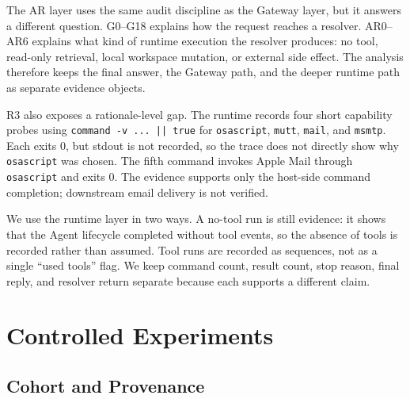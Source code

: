 \documentclass[11pt,a4paper]{article}
\begin{document}
The AR layer uses the same audit discipline as the Gateway layer, but it
answers a different question. G0--G18 explains how the request reaches a
resolver. AR0--AR6 explains what kind of runtime execution the resolver
produces: no tool, read-only retrieval, local workspace mutation, or
external side effect. The analysis therefore keeps the final answer, the
Gateway path, and the deeper runtime path as separate evidence objects.

\begin{table}[H]
\centering
\caption{AR-layer scores. AR2 is a logical outcome stage; no-tool runs
count the observed no-tool outcome, while tool result ratio is reported
separately.}
\label{tab:ar-metrics}
{\scriptsize

}
\end{table}

R3 also exposes a rationale-level gap. The runtime records four short
capability probes using \texttt{command -v ... || true} for
\texttt{osascript}, \texttt{mutt}, \texttt{mail}, and \texttt{msmtp}.
Each exits 0, but stdout is not recorded, so the trace does not directly
show why \texttt{osascript} was chosen. The fifth command invokes Apple
Mail through \texttt{osascript} and exits 0. The evidence supports only
the host-side command completion; downstream email delivery is not
verified.

We use the runtime layer in two ways. A no-tool run is still evidence: it
shows that the Agent lifecycle completed without tool events, so the
absence of tools is recorded rather than assumed. Tool runs are recorded
as sequences, not as a single ``used tools'' flag. We keep command count,
result count, stop reason, final reply, and resolver return separate
because each supports a different claim.

\section{Controlled Experiments}
\label{sec:experiments}

\subsection{Cohort and Provenance}
\end{document}
